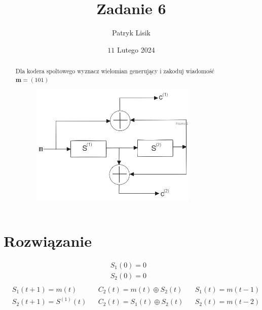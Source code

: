 \documentclass[12pt]{article}
\title{Zadanie 6}
\author{Patryk Lisik}
\date{\(11\) Lutego  2024}
\begin{document}
    \maketitle
    \renewcommand{\abstractname}{Treść}

    \begin{abstract}
    Dla kodera spoltowego wyznacz wielomian generujący i zakoduj wiadomość $\mathbf{m} = (101) $ 
    \begin{figure}[h]
        \centering
        \includegraphics[width=8cm]{cyclic_koder.png}
    \end{figure}

    \end{abstract}



    \section*{Rozwiązanie}
    \begin{align*}
        S_1(0) = 0 & \\ 
        S_2(0) = 0 & \\
    \end{align*}
    \begin{align*}
        & S_1(t+1)=m(t) & & C_2(t) = m(t) \oplus S_2(t) & & S_1(t)=m(t-1) \\
        & S_2(t+1)=S^{(1)}(t) & & C_2(t) = S_1(t) \oplus S_2(t) & & S_2(t)=m(t-2) \\
    \end{align*}
\end{document}
